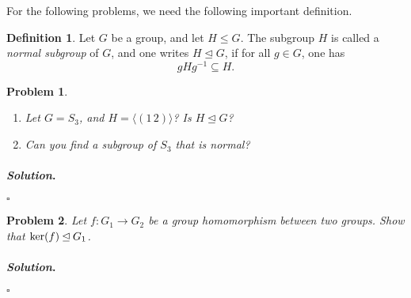 \documentclass[reqno]{amsart}
\theoremstyle{plain}
\newtheorem{problem}{Problem}
\theoremstyle{definition}
\newtheorem{definition}{Definition}
\newenvironment{solution}{\paragraph{\emph{Solution}.}}{\hfill$\square$}
\begin{document}
For the following problems, we need the following important definition.
\begin{definition}
Let $G$ be a group, and let $H \le G$.  The subgroup $H$ is called a \emph{normal subgroup} of $G$, and one writes $H \unlhd G$, if for all $g \in G$, one has
$$gHg^{-1} \subseteq H. $$
\end{definition}

\begin{problem}
\hspace{1cm}
\begin{enumerate}
\item Let $G = S_{3}$, and $H = \langle (1 \, 2) \rangle$?  Is $H \unlhd G$?  
\item Can you find a subgroup of $S_{3}$ that is normal?
\end{enumerate}
\end{problem}
\begin{solution}

\end{solution}

\begin{problem}
Let $f:G_{1} \rightarrow G_{2}$ be a group homomorphism between two groups.  Show that ${\rm ker}(f) \unlhd G_{1}$.
\end{problem}
\begin{solution}

\end{solution}
\end{document}

